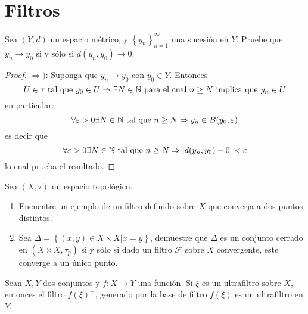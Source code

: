 \documentclass[12pt]{report}
\theoremstyle{largebreak}
\newcommand\abs[1]{\ensuremath{\left|#1\right|}}
\newcommand\cf[3]{\ensuremath{#1:#2\rightarrow#3}}
\begin{document}
    \section{Filtros}

    \begin{excer}
        Sea $(Y,d)$ un espacio métrico, y $\left\{ y_n\right\}_{ n=1}^\infty$ una sucesión en $Y$. Pruebe que $y_n\rightarrow y_0$ si y sólo si $d(y_n,y_0)\rightarrow0$.
    \end{excer}

    \begin{proof}
        $\Rightarrow)$: Suponga que $y_n\rightarrow y_0$ con $y_0\in Y$. Entonces
        \begin{equation*}
            U\in\tau\textup{ tal que }y_0\in U\Rightarrow\exists N\in\mathbb{N}\textup{ para el cual }n\geq N\textup{ implica que }y_n\in U
        \end{equation*}
        en particular:
        \begin{equation*}
            \forall \varepsilon>0\exists N\in\mathbb{N}\textup{ tal que }n\geq N\Rightarrow y_n\in B(y_0,\varepsilon)
        \end{equation*}
        es decir que
        \begin{equation*}
            \forall \varepsilon>0\exists N\in\mathbb{N}\textup{ tal que }n\geq N\Rightarrow \abs{d(y_n,y_0)-0}<\varepsilon
        \end{equation*}
        lo cual prueba el resultado.
    \end{proof}

    \begin{excer}
        Sea $(X,\tau)$ un espacio topológico.
        \begin{enumerate}
            \item Encuentre un ejemplo de un filtro definido sobre $X$ que converja a dos puntos distintos.
            \item Sea $\Delta=\left\{(x,y)\in X\times X\Big|x=y \right\}$, demuestre que $\Delta$ es un conjunto cerrado en $(X\times X,\tau_p)$ si y sólo si dado un filtro $\mathcal{F}$ sobre $X$ convergente, este converge a un único punto.
        \end{enumerate}
    \end{excer}

    \begin{excer}
        Sean $X,Y$ dos conjuntos y $\cf{f}{X}{Y}$ una función. Si $\xi$ es un ultrafiltro sobre $X$, entonces el filtro $f(\xi)^+$, generado por la base de filtro $f(\xi)$ es un ultrafiltro en $Y$.
    \end{excer}
\end{document}
